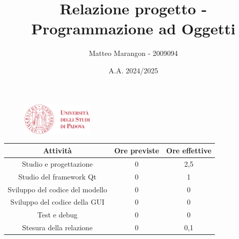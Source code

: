 \documentclass[10pt]{article}
\title{Relazione progetto - Programmazione ad Oggetti}
\author{Matteo Marangon - 2009094}
\date{A.A. 2024/2025}
\begin{document}
\begin{figure}
    \centering
    \includegraphics[width=0.3\textwidth]{./unipdlogo.png}
\end{figure}
\maketitle

\newpage

\tableofcontents
\newpage

\begin{center}
    \begin{tabular}{| c | c | c |} \hline
    Attività & Ore previste & Ore effettive \\\hline
    Studio e progettazione & 0 & 2,5 \\
    Studio del framework Qt & 0 & 1 \\
    Sviluppo del codice del modello & 0 & 0 \\
    Sviluppo del codice della GUI & 0 & 0 \\
    Test e debug & 0 & 0 \\
    Stesura della relazione & 0 & 0,1 \\\hline
    \end{tabular}
\end{center}
\end{document}
